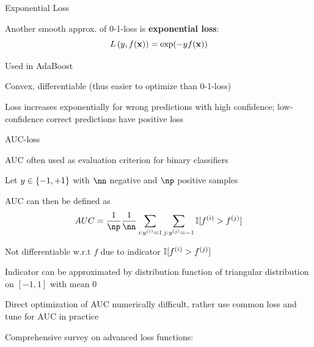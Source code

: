 \documentclass[11pt,compress,t,notes=noshow, xcolor=table]{beamer}
\begin{document}
\begin{framei}[sep=M]{Exponential Loss}

\item Another smooth 
approx. of 0-1-loss is \textbf{exponential loss}:
$$L\left(y, f(\mathbf{x})\right) = \exp(-y f(\mathbf{x}))$$ 
\item Used in AdaBoost
\item Convex, differentiable (thus easier to optimize than 0-1-loss)
\item Loss increases exponentially for wrong predictions with high confidence; low-confidence correct predictions have positive loss


\end{framei}

\begin{frame}{AUC-loss}

\begin{itemizeM}
\item AUC often used as evaluation criterion for binary classifiers
\item Let $y \in \{-1, +1\}$ with $\nn$ negative and $\np$ positive samples 
\item AUC can then be defined as
$$AUC = \frac{1}{\np} \frac{1}{\nn} \sum_{i: \yi = 1} \sum_{j: \yi[j] = -1} \I [f^{(i)} > f^{(j)}]$$
\item Not differentiable w.r.t $f$ due to indicator $\mathbb{I} [f^{(i)} > f^{(j)}]$
\item Indicator can be approximated by distribution function of triangular distribution on $[-1, 1]$ with mean $0$
\item Direct optimization of AUC numerically difficult, rather use common loss and tune for AUC in practice
\end{itemizeM}
\vfill
Comprehensive survey on advanced loss functions: 

\end{frame}

\endlecture
\end{document}
